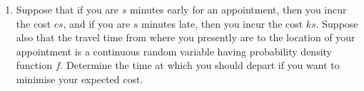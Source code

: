 \documentclass[svgnames]{amsart}
\begin{document}
\begin{enumerate}[leftmargin=*, itemsep=0.3em]
\item Suppose that if you are $s$ minutes early for an appointment, then you incur the cost $cs$, and if you are $s$ minutes late, then you incur the cost $ks$. Suppose also that the travel time from where you presently are to the location of your appointment is a continuous random variable having probability density function $f$. Determine the time at which you should depart if you want to minimise your expected cost.
\end{enumerate}
\end{document}
